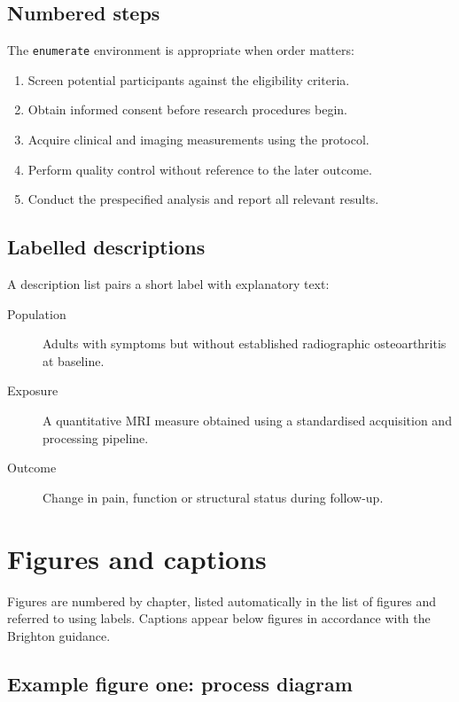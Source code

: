 \subsection{Numbered steps}

The \texttt{enumerate} environment is appropriate when order matters:

\begin{enumerate}
  \item Screen potential participants against the eligibility criteria.
  \item Obtain informed consent before research procedures begin.
  \item Acquire clinical and imaging measurements using the protocol.
  \item Perform quality control without reference to the later outcome.
  \item Conduct the prespecified analysis and report all relevant results.
\end{enumerate}

\subsection{Labelled descriptions}

A description list pairs a short label with explanatory text:

\begin{description}
  \item[Population] Adults with symptoms but without established radiographic
    osteoarthritis at baseline.
  \item[Exposure] A quantitative MRI measure obtained using a standardised
    acquisition and processing pipeline.
  \item[Outcome] Change in pain, function or structural status during follow-up.
\end{description}

\section{Figures and captions}

Figures are numbered by chapter, listed automatically in the list of figures
and referred to using labels. Captions appear below figures in accordance with
the Brighton guidance.

\subsection{Example figure one: process diagram}


